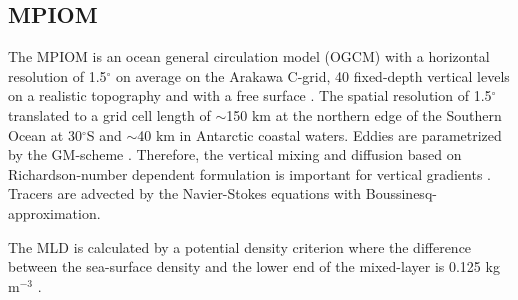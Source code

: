 \subsection{MPIOM}
\label{sec:mpiom}
The \ac{MPIOM} is an ocean general circulation model (OGCM) with a horizontal resolution of 1.5$^\circ$ on average on the Arakawa C-grid, 40 fixed-depth vertical levels on a realistic topography and with a free surface \citep{Jungclaus2013}.  %
The spatial resolution of 1.5$^\circ$ translated to a grid cell length of $\sim$150 km at the northern edge of the Southern Ocean at 30$^\circ$S and $\sim$40 km in Antarctic coastal waters. %
Eddies are parametrized by the GM-scheme \citep{Gent1995}. Therefore, the vertical mixing and diffusion based on Richardson-number dependent formulation is important for vertical gradients \citep{Pacanowski1981}. Tracers are advected by the Navier-Stokes equations with Boussinesq-approximation.%

The \ac{MLD} is calculated by a potential density criterion where the difference between the sea-surface density and the lower end of the mixed-layer is 0.125 kg m$^{-3}$ \citep{Jungclaus2013}. 





